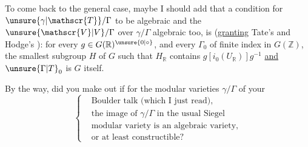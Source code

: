 To come back to the general case, maybe I should add that a \uline{} condition for $\unsure{\gamma|\mathscr{T}}/\Gamma$ to be algebraic and the  $\unsure{\mathscr{V}|V}/\Gamma$ over $\gamma/\Gamma$ algebraic too, is (\uline{granting} Tate's and Hodge's ): for every $g\in G(\mathbb{R})^{\unsure{0|\circ}}$, and every $\Gamma_0$ of finite index in $G(\mathbb{Z})$, the smallest  subgroup $H$ of $G$ such that $H_{\mathbb{R}}$ contains $g[i_0(U_{\mathbb{R}})]g^{-1}$ \uline{and} $\unsure{\Gamma|T}_0$ is $G$ itself.



By the way, did you make out if for the modular varieties $\gamma/\Gamma$ of your
\[
\left\{\begin{aligned}
&\text{Boulder talk (which I just read),}\\
&\text{the image of }\gamma/\Gamma\text{ in the usual Siegel}\\
&\text{modular variety is an algebraic variety,}\\
&\text{or at least constructible?}
\end{aligned}\right.
\]

